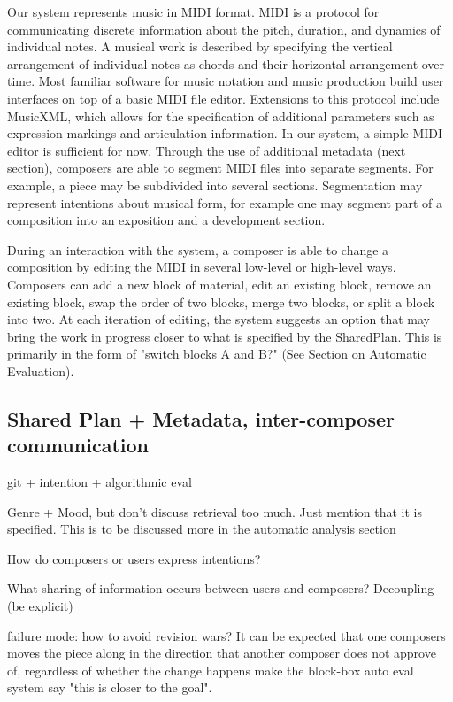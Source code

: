 \documentclass[final,authoryear,5p,times,twocolumn]{elsarticle}
\begin{document}
Our system represents music in MIDI format. MIDI is a protocol for communicating discrete information about the pitch, duration, and dynamics of individual notes. A musical work is described by specifying the vertical arrangement of individual notes as chords and their horizontal arrangement over time. Most familiar software for music notation and music production build user interfaces on top of a basic MIDI file editor. Extensions to this protocol include MusicXML, which allows for the specification of additional parameters such as expression markings and articulation information. In our system, a simple MIDI editor is sufficient for now. Through the use of additional metadata (next section), composers are able to segment MIDI files into separate segments. For example, a piece may be subdivided into several sections. Segmentation may represent intentions about musical form, for example one may segment part of a composition into an exposition and a development section. 


During an interaction with the system, a composer is able to change a composition by editing the MIDI in several low-level or high-level ways. Composers can add a new block of material, edit an existing block, remove an existing block, swap the order of two blocks, merge two blocks, or split a block into two. At each iteration of editing, the system suggests an option that may bring the work in progress closer to what is specified by the SharedPlan. This is primarily in the form of "switch blocks A and B?" (See Section on Automatic Evaluation).

\subsection{Shared Plan + Metadata, inter-composer communication}


git + intention + algorithmic eval

Genre + Mood, but don't discuss retrieval too much. Just mention that it is specified. This is to be discussed more in the automatic analysis section

How do composers or users express intentions?

What sharing of information occurs between users and composers? Decoupling (be explicit)

failure mode: how to avoid revision wars? It can be expected that one composers moves the piece along in the direction that another composer does not approve of, regardless of whether the change happens make the block-box auto eval system say "this is closer to the goal".
\end{document}
